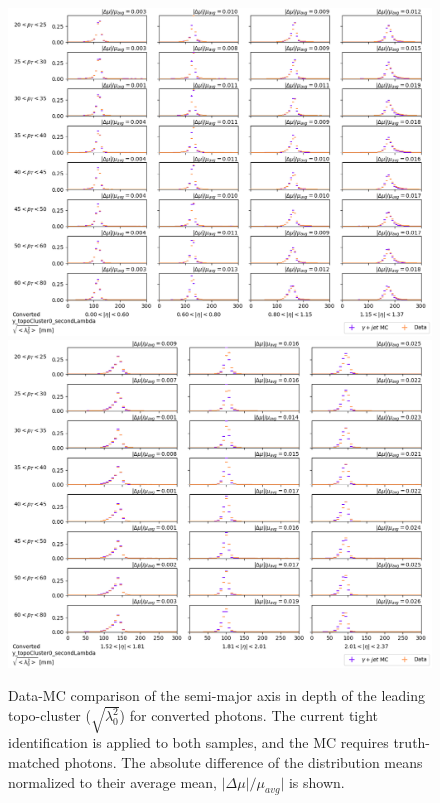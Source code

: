 \begin{figure}[!thp]
    \centering
    \includegraphics[width=.74\textwidth]{appendices/datamc_images/y_topoCluster0_secondLambda_Converted_lowerEta.png}
    \includegraphics[width=.74\textwidth]{appendices/datamc_images/y_topoCluster0_secondLambda_Converted_upperEta.png}
    \caption[Data-MC comparison of the semi-major axis in depth of the leading topo-cluster (${\sqrt{\lambda_0^2}}$) for converted photons]{Data-MC comparison of the semi-major axis in depth of the leading topo-cluster ($\sqrt{\lambda_0^2}$) for converted photons. The current tight identification is applied to both samples, and the \gls{MC} requires truth-matched photons. The absolute difference of the distribution means normalized to their average mean, $|\Delta \mu|/\mu_{avg}|$ is shown.}
    \label{fig:dmc-c-sl}
\end{figure}
